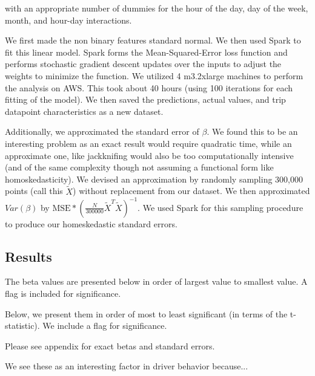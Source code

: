 \documentclass[twoside]{article}
\begin{document}
\begin{multicols}{2}
\noindent with an appropriate number of dummies for the hour of the day, day of the week, month, and hour-day interactions. 

We first made the non binary features standard normal. We then used Spark to fit this linear model. Spark forms the Mean-Squared-Error loss function and performs stochastic gradient descent updates over the inputs to adjust the weights to minimize the function. We utilized 4 m3.2xlarge machines to perform the analysis on AWS. This took about 40 hours (using 100 iterations for each fitting of the model). We then saved the predictions, actual values, and trip datapoint characteristics as a new dataset. 

Additionally, we approximated the standard error of $\beta$. We found this to be an interesting problem as an exact result would require quadratic time, while an approximate one, like jackknifing would also be too computationally intensive (and of the same complexity though not assuming a functional form like homoskedasticity).  We devised an approximation by randomly sampling 300,000 points (call this $\tilde{X}$) without replacement from our dataset. We then approximated $Var(\beta)$ by $\text{MSE}*(\frac{N}{300000}\tilde{X}^T\tilde{X})^{-1}$. We used Spark for this sampling procedure to produce our homeskedastic standard errors. 
\subsection{Results}

The beta values are presented below in order of largest value to smallest value. A flag is included for significance.

Below, we present them in order of most to least significant (in terms of the t-statistic). We include a flag for significance.

Please see appendix for exact betas and standard errors.

We see these as an interesting factor in driver behavior because...


\end{multicols}
\end{document}
